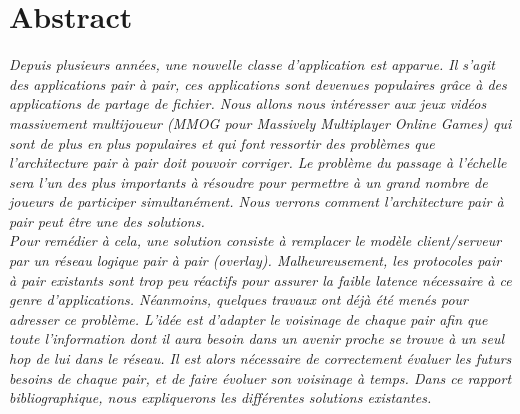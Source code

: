 \section{Abstract}
	\textit{Depuis plusieurs années, une nouvelle classe d'application est apparue. Il s'agit des applications pair à pair, ces applications sont devenues populaires grâce à des applications de partage de fichier. Nous allons nous intéresser aux jeux vidéos massivement multijoueur (MMOG pour Massively Multiplayer Online Games) qui sont de plus en plus populaires et qui font ressortir des problèmes que l'architecture pair à pair doit pouvoir corriger. Le problème du passage à l'échelle sera l'un des plus importants à résoudre pour permettre à un grand nombre de joueurs de participer simultanément. Nous verrons comment l'architecture pair à pair peut être une des solutions.\\ 
	Pour remédier à cela, une solution consiste à remplacer le modèle client/serveur par un réseau logique pair à pair (overlay). Malheureusement, les protocoles pair à pair existants sont trop peu réactifs pour assurer la faible latence nécessaire à ce genre d’applications. Néanmoins, quelques travaux ont déjà été menés pour adresser ce problème. L’idée est d’adapter le voisinage de chaque pair afin que toute l’information dont il aura besoin dans un avenir proche se trouve à un seul hop de lui dans le réseau. Il est alors nécessaire de correctement évaluer les futurs besoins de chaque pair, et de faire évoluer son voisinage à temps. Dans ce rapport bibliographique, nous expliquerons les différentes solutions existantes.}\\

